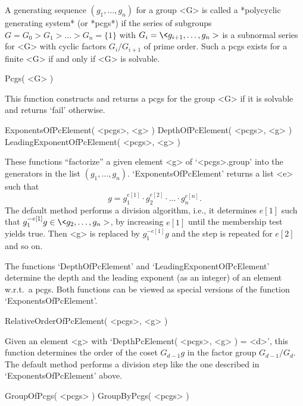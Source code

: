 

A  generating  sequence $(g_1,\ldots,g_n)$ for a   group <G> is  called a
*polycyclic generating system* (or *pcgs*)  if the series of subgroups $G
= G_0 > G_1 > \ldots >  G_n = \{1\}$ with  $G_i = \< g_{i+1}, \ldots, g_n
>$ is a  subnormal series for   <G> with cyclic factors $G_i/G_{i+1}$  of
prime order. Such  a pcgs exists for  a finite <G> if  and only if <G> is
solvable.

\>Pcgs( <G> )

This function constructs  and returns a  pcgs for the group  <G> if it is
solvable and returns `fail' otherwise.

\>ExponentsOfPcElement( <pcgs>, <g> )
\>DepthOfPcElement( <pcgs>, <g> )
\>LeadingExponentOfPcElement( <pcgs>, <g> )

These functions ``factorize'' a given  element <g> of `<pcgs>.group' into
the  generators  in  the  list $(g_1,\ldots,g_n)$. `ExponentsOfPcElement'
returns a list <e> such that
$$ g = g_1^{e[1]} \cdot g_2^{e[2]} \cdot \ldots \cdot g_n^{e[n]}. $$
The  default method  performs  a division algorithm,  i.e., it determines
$e[1]$ such that $g_1^{-e[1]}g \in \< g_2, \ldots,  g_n >$, by increasing
$e[1]$  until the membership  test yields  true. Then  <g> is replaced by
$g_1^{-e[1]}g$ and the step is repeated for $e[2]$ and so on.

The functions   `DepthOfPcElement'      and  `LeadingExponentOfPcElement'
determine  the depth  and  the leading  exponent   (as an integer)  of an
element w.r.t.\ a pcgs. Both functions can be  viewed as special versions
of the function `ExponentsOfPcElement'.

\>RelativeOrderOfPcElement( <pcgs>, <g> )

Given an element <g> with  `DepthPcElement( <pcgs>, <g>   ) = <d>',  this
function determines the order of the coset $G_{d-1}g$ in the factor group
$G_{d-1}/G_d$. The default method performs  a division step like the  one
described in `ExponentsOfPcElement' above.

\null

\>GroupOfPcgs( <pcgs> )
\>GroupByPcgs( <pcgs> )

